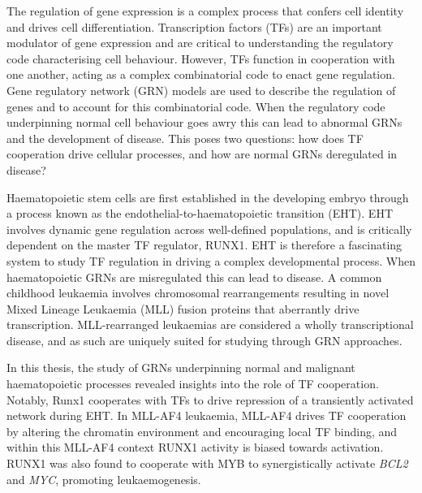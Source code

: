 
The regulation of gene expression is a complex process that confers cell identity and drives cell differentiation. Transcription factors (TFs) are an important modulator of gene expression and are critical to understanding the regulatory code characterising cell behaviour. However, TFs function in cooperation with one another, acting as a complex combinatorial code to enact gene regulation. Gene regulatory network (GRN) models are used to describe the regulation of genes and to account for this combinatorial code. When the regulatory code underpinning normal cell behaviour goes awry this can lead to abnormal GRNs and the development of disease. This poses two questions: how does TF cooperation drive cellular processes, and how are normal GRNs deregulated in disease?

Haematopoietic stem cells are first established in the developing embryo through a process known as the endothelial-to-haematopoietic transition (EHT). EHT involves dynamic gene regulation across well-defined populations, and is critically dependent on the master TF regulator, RUNX1. EHT is therefore a fascinating system to study TF regulation in driving a complex developmental process. When haematopoietic GRNs are misregulated this can lead to disease. A common childhood leukaemia involves chromosomal rearrangements resulting in novel Mixed Lineage Leukaemia (MLL) fusion proteins that aberrantly drive transcription. MLL-rearranged leukaemias are considered a wholly transcriptional disease, and as such are uniquely suited for studying through GRN approaches.

In this thesis, the study of GRNs underpinning normal and malignant haematopoietic processes revealed insights into the role of TF cooperation. Notably, Runx1 cooperates with TFs to drive repression of a transiently activated network during EHT. In MLL-AF4 leukaemia, MLL-AF4 drives TF cooperation by altering the chromatin environment and encouraging local TF binding, and within this MLL-AF4 context RUNX1 activity is biased towards activation. RUNX1 was also found to cooperate with MYB to synergistically activate \textit{BCL2} and \textit{MYC}, promoting leukaemogenesis.